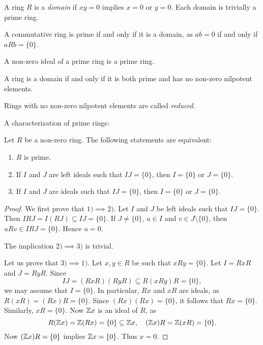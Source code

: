 A ring $R$ is a \emph{domain} if $xy=0$ implies
$x=0$ or $y=0$. Each domain is trivially a prime ring.

\begin{example}
    A commutative ring is prime if and only if it is a domain, as $ab=0$ 
    if and only if $aRb=\{0\}$.
\end{example}

\begin{example}
    A non-zero ideal of a prime ring is a prime ring.
\end{example}

\begin{exercise}
\label{xca:domain<=>prime+reduced}
    A ring is a domain if and only if
    it is both prime and has no non-zero nilpotent elements. 
\end{exercise}

Rings with no non-zero nilpotent elements are called \emph{reduced}.

A characterization of prime rings:

\begin{proposition}
    Let $R$ be a non-zero ring. The following statements are equivalent:
	\begin{enumerate}
		\item $R$ is prime.
		\item If $I$ and $J$ are left ideals such that $IJ=\{0\}$, then 
			$I=\{0\}$ or $J=\{0\}$.
		\item If $I$ and $J$ are ideals such that $IJ=\{0\}$, then $I=\{0\}$ or
			$J=\{0\}$.
	\end{enumerate}
\end{proposition}

\begin{proof}
	We first prove that $1)\implies2)$. Let $I$ and $J$ be left ideals such that
	$IJ=\{0\}$. Then $IRJ=I(RJ)\subseteq IJ=\{0\}$. If $J\ne
	\{0\}$, $u\in I$ and $v\in J\setminus\{0\}$, then $uRv\in IRJ=\{0\}$. Hence 
	$u=0$.

	The implication $2)\implies3)$ is trivial. 

    Let us prove that $3)\implies1)$. Let $x,y\in R$ be such that $xRy=\{0\}$.
	Let $I=RxR$ and $J=RyR$. Since 
    \[
    IJ=(RxR)(RyR)\subseteq R(xRy)R=\{0\},
    \]
	we may assume that $I=\{0\}$. In particular, $Rx$ and $xR$ are ideals, as 
	$R(xR)=(Rx)R=\{0\}$. Since $(Rx)(Rx)=\{0\}$, it follows that 
    $Rx=\{0\}$. Similarly, $xR=\{0\}$. Now $\mathbb{Z} x$ is an ideal of $R$, as 
    \[
    R(\mathbb{Z} x)=\mathbb{Z}(Rx)=\{0\}\subseteq\mathbb{Z} x,\quad 
    (\mathbb{Z} x)R=\mathbb{Z}(xR)=\{0\}.
    \]
    Now $(\mathbb{Z} x)R=\{0\}$ implies $\mathbb{Z} x=\{0\}$. 
	Thus $x=0$. 
\end{proof}

